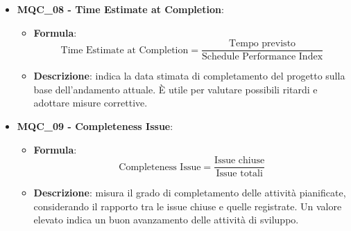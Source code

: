 \begin{itemize}
\item \textbf{MQC\_08 - Time Estimate at Completion}:
    \begin{itemize}
        \item \textbf{Formula}:
        \[
            \text{Time Estimate at Completion} =
            \frac{\text{Tempo previsto}}{\text{Schedule Performance Index}}
        \]
        \item \textbf{Descrizione}: indica la data stimata di completamento del progetto sulla base dell’andamento attuale. È utile per valutare possibili ritardi e adottare misure correttive.
    \end{itemize}

\item \textbf{MQC\_09 - Completeness Issue}:
    \begin{itemize}
        \item \textbf{Formula}:
        \[
            \text{Completeness Issue} =
            \frac{\text{Issue chiuse}}{\text{Issue totali}}
        \]
        \item \textbf{Descrizione}: misura il grado di completamento delle attività pianificate, considerando il rapporto tra le issue chiuse e quelle registrate. Un valore elevato indica un buon avanzamento delle attività di sviluppo.
    \end{itemize}
\end{itemize}

